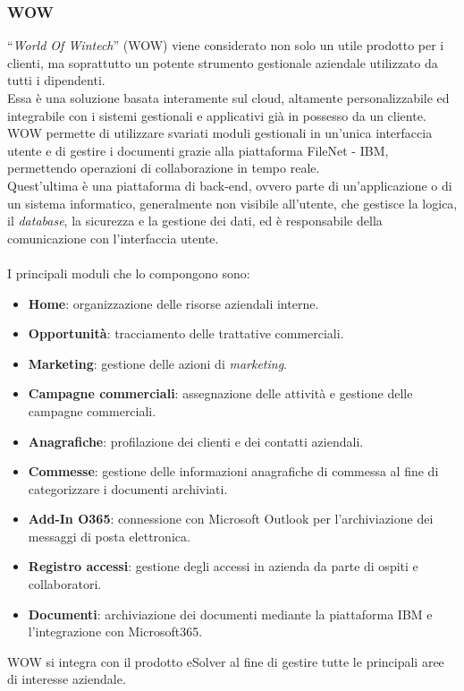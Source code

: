 \subsubsection*{WOW}
\label{WOW}
“\emph{World Of Wintech}” (WOW) viene considerato non solo un utile prodotto per i clienti, ma soprattutto un potente strumento gestionale aziendale utilizzato da tutti i dipendenti.\\ 
Essa è una soluzione basata interamente sul \gls{cloud}, altamente personalizzabile ed integrabile con i sistemi gestionali e applicativi già in possesso da un cliente.\\
WOW permette di utilizzare svariati moduli gestionali in un'unica interfaccia utente e di gestire i documenti grazie alla piattaforma FileNet - IBM, permettendo operazioni di collaborazione in tempo reale.\\
Quest'ultima è una piattaforma di \gls{back-end}, ovvero parte di un'applicazione o di un sistema informatico, generalmente non visibile all'utente, che gestisce la logica, il \emph{database}, la sicurezza e la gestione dei dati, ed è responsabile della comunicazione con l'interfaccia utente.\\\\
I principali moduli che lo compongono sono: 

\begin{itemize}
    \item \textbf{Home}: organizzazione delle risorse aziendali interne. 
    \item \textbf{Opportunità}: tracciamento delle trattative commerciali. 
    \item \textbf{Marketing}: gestione delle azioni di \emph{marketing}. 
    \item \textbf{Campagne commerciali}: assegnazione delle attività e gestione delle campagne commerciali.
    \item \textbf{Anagrafiche}: profilazione dei clienti e dei contatti aziendali. 
    \item \textbf{Commesse}: gestione delle informazioni anagrafiche di commessa al fine di categorizzare i documenti archiviati.
    \item \textbf{Add-In O365}: connessione con Microsoft Outlook per l'archiviazione dei messaggi di posta elettronica.
    \item \textbf{Registro accessi}: gestione degli accessi in azienda da parte di ospiti e collaboratori.
    \item \textbf{Documenti}: archiviazione dei documenti mediante la piattaforma IBM e l'integrazione con Microsoft365.\\
\end{itemize}
WOW si integra con il prodotto eSolver al fine di gestire tutte le principali aree di interesse aziendale.\\

